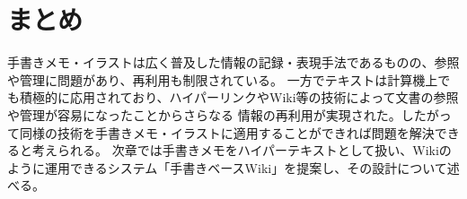 \section{まとめ}
手書きメモ・イラストは広く普及した情報の記録・表現手法であるものの、参照や管理に問題があり、再利用も制限されている。
一方でテキストは計算機上でも積極的に応用されており、ハイパーリンクやWiki等の技術によって文書の参照や管理が容易になったことからさらなる
情報の再利用が実現された。したがって同様の技術を手書きメモ・イラストに適用することができれば問題を解決できると考えられる。
次章では手書きメモをハイパーテキストとして扱い、Wikiのように運用できるシステム「手書きベースWiki」を提案し、その設計について述べる。